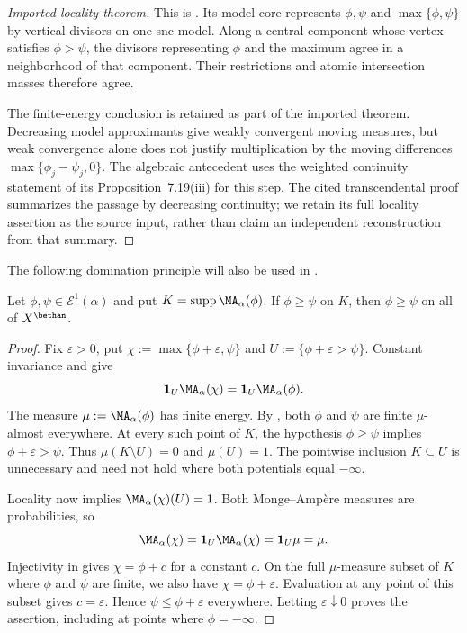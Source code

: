 \begin{proof}[Imported locality theorem]
This is \cite[Theorem~8.1.1, pp.~28--29]{MPWN25}.
Its model core represents $\phi,\psi$ and $\max\{\phi,\psi\}$ by
vertical divisors on one snc model. Along a central component whose
vertex satisfies $\phi>\psi$, the divisors representing $\phi$ and
the maximum agree in a neighborhood of that component. Their
restrictions and atomic intersection masses therefore agree.

The finite-energy conclusion is retained as part of the imported
theorem. Decreasing model approximants give weakly convergent moving
measures, but weak convergence alone does not justify multiplication
by the moving differences $\max\{\phi_j-\psi_j,0\}$. The algebraic
antecedent \cite[Theorem~7.40 and its proof, pp.~768--770]{BJ22}
uses the weighted continuity statement of its Proposition~7.19(iii)
for this step. The cited transcendental proof summarizes the passage
by decreasing continuity; we retain its full locality assertion as
the source input, rather than claim an independent reconstruction
from that summary.
\end{proof}

The following domination principle will also be used in .

\begin{corollary}
\label{cor:mpwn-domination}
Let $\phi,\psi\in\mathcal E^1(\alpha)$ and put
$K=\operatorname{supp}\MA_\alpha(\phi)$.  If $\phi\geq\psi$ on $K$,
then $\phi\geq\psi$ on all of $X^{\bethan}$.
\end{corollary}

\begin{proof}
Fix $\varepsilon>0$, put $\chi:=\max\{\phi+\varepsilon,\psi\}$ and
$U:=\{\phi+\varepsilon>\psi\}$.  Constant invariance and
 give
\[
 \mathbf1_U\MA_\alpha(\chi)=\mathbf1_U\MA_\alpha(\phi).
\]
The measure $\mu:=\MA_\alpha(\phi)$ has finite energy.
By , both $\phi$ and $\psi$ are finite
$\mu$-almost everywhere.  At every such point of $K$, the hypothesis
$\phi\geq\psi$ implies $\phi+\varepsilon>\psi$.
Thus $\mu(K\setminus U)=0$ and $\mu(U)=1$.
The pointwise inclusion $K\subseteq U$ is unnecessary and need not
hold where both potentials equal $-\infty$.

Locality now implies $\MA_\alpha(\chi)(U)=1$.
Both Monge--Amp\`ere measures are probabilities, so
\[
 \MA_\alpha(\chi)=\mathbf1_U\MA_\alpha(\chi)
                 =\mathbf1_U\mu=\mu.
\]
Injectivity in  gives $\chi=\phi+c$ for a
constant $c$.  On the full $\mu$-measure subset of $K$ where
$\phi$ and $\psi$ are finite, we also have $\chi=\phi+\varepsilon$.
Evaluation at any point of this subset gives $c=\varepsilon$.
Hence $\psi\leq\phi+\varepsilon$ everywhere.
Letting $\varepsilon\downarrow0$ proves the assertion, including
at points where $\phi=-\infty$.
\end{proof}


